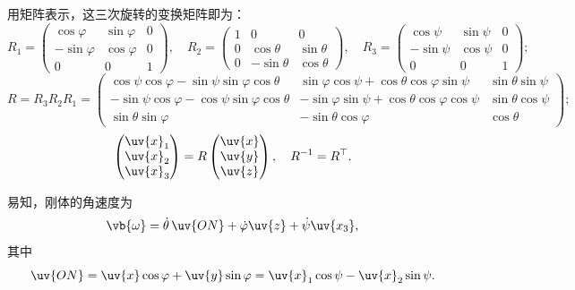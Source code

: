 用矩阵表示，这三次旋转的变换矩阵即为：
\begin{equation*}
	R_1 = \begin{pmatrix}
		\cos \varphi  & \sin \varphi & 0 \\
		-\sin \varphi & \cos \varphi & 0 \\
		0             & 0            & 1
	\end{pmatrix}, \quad
	R_2 = \begin{pmatrix}
		1 & 0            & 0           \\
		0 & \cos \theta  & \sin \theta \\
		0 & -\sin \theta & \cos \theta
	\end{pmatrix}, \quad
	R_3 = \begin{pmatrix}
		\cos \psi  & \sin \psi & 0 \\
		-\sin \psi & \cos \psi & 0 \\
		0          & 0         & 1
	\end{pmatrix};
\end{equation*}
\begin{equation*}
	R = R_3 R_2 R_1 = \begin{pmatrix}
		\cos \psi \cos \varphi - \sin \psi \sin \varphi \cos \theta  & \sin \varphi \cos \psi + \cos \theta \cos \varphi \sin \psi  & \sin \theta \sin \psi \\
		-\sin \psi \cos \varphi - \cos \psi \sin \varphi \cos \theta & -\sin \varphi \sin \psi + \cos \theta \cos \varphi \cos \psi & \sin \theta \cos \psi \\
		\sin \theta \sin \varphi                                     & -\sin \theta \cos \varphi                                    & \cos \theta
	\end{pmatrix};
\end{equation*}
\begin{equation*}
	\begin{pmatrix}
		\uv{x}_1 \\
		\uv{x}_2 \\
		\uv{x}_3
	\end{pmatrix} = R \begin{pmatrix}
		\uv{x} \\
		\uv{y} \\
		\uv{z}
	\end{pmatrix}, \quad R^{-1} = R^\top.
\end{equation*}

易知，刚体的角速度为
\begin{equation*}
	\vb{\omega} = \dot{\theta}\, \uv{ON} + \dot{\varphi} \uv{z} + \dot{\psi} \uv{x_3},
\end{equation*}
其中
\begin{equation*}
	\uv{ON} = \uv{x} \cos \varphi + \uv{y} \sin \varphi = \uv{x}_1 \cos \psi - \uv{x}_2 \sin \psi.
\end{equation*}

